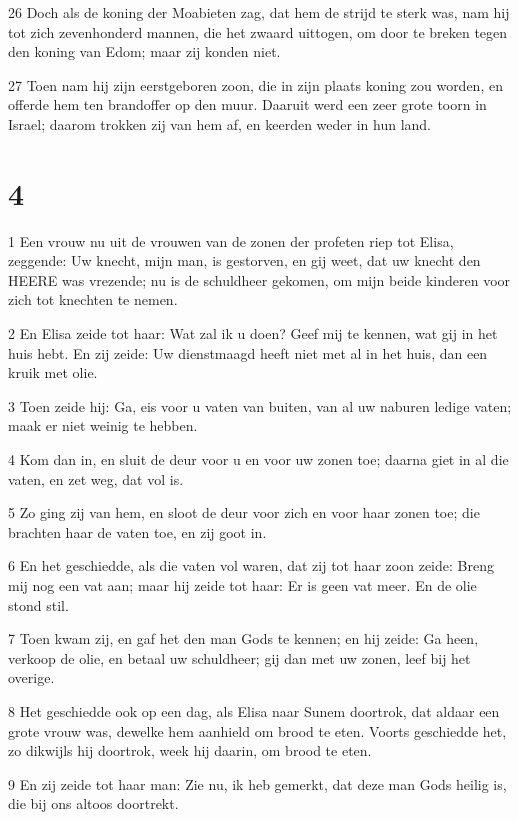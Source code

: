 \par 26 Doch als de koning der Moabieten zag, dat hem de strijd te sterk was, nam hij tot zich zevenhonderd mannen, die het zwaard uittogen, om door te breken tegen den koning van Edom; maar zij konden niet.
\par 27 Toen nam hij zijn eerstgeboren zoon, die in zijn plaats koning zou worden, en offerde hem ten brandoffer op den muur. Daaruit werd een zeer grote toorn in Israel; daarom trokken zij van hem af, en keerden weder in hun land.

\chapter{4}

\par 1 Een vrouw nu uit de vrouwen van de zonen der profeten riep tot Elisa, zeggende: Uw knecht, mijn man, is gestorven, en gij weet, dat uw knecht den HEERE was vrezende; nu is de schuldheer gekomen, om mijn beide kinderen voor zich tot knechten te nemen.
\par 2 En Elisa zeide tot haar: Wat zal ik u doen? Geef mij te kennen, wat gij in het huis hebt. En zij zeide: Uw dienstmaagd heeft niet met al in het huis, dan een kruik met olie.
\par 3 Toen zeide hij: Ga, eis voor u vaten van buiten, van al uw naburen ledige vaten; maak er niet weinig te hebben.
\par 4 Kom dan in, en sluit de deur voor u en voor uw zonen toe; daarna giet in al die vaten, en zet weg, dat vol is.
\par 5 Zo ging zij van hem, en sloot de deur voor zich en voor haar zonen toe; die brachten haar de vaten toe, en zij goot in.
\par 6 En het geschiedde, als die vaten vol waren, dat zij tot haar zoon zeide: Breng mij nog een vat aan; maar hij zeide tot haar: Er is geen vat meer. En de olie stond stil.
\par 7 Toen kwam zij, en gaf het den man Gods te kennen; en hij zeide: Ga heen, verkoop de olie, en betaal uw schuldheer; gij dan met uw zonen, leef bij het overige.
\par 8 Het geschiedde ook op een dag, als Elisa naar Sunem doortrok, dat aldaar een grote vrouw was, dewelke hem aanhield om brood te eten. Voorts geschiedde het, zo dikwijls hij doortrok, week hij daarin, om brood te eten.
\par 9 En zij zeide tot haar man: Zie nu, ik heb gemerkt, dat deze man Gods heilig is, die bij ons altoos doortrekt.
